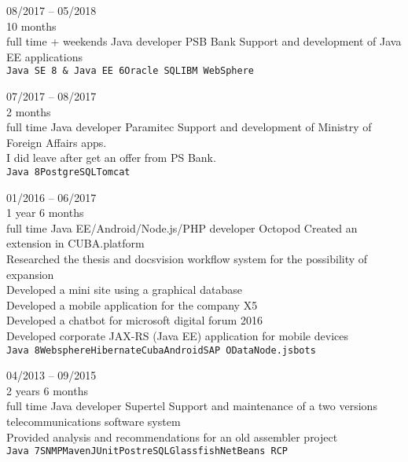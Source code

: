 \begin{entrylist}
    \entry
    {08/2017 -- 05/2018\\\footnotesize{10 months\\full time + weekends}}
    {Java developer}
    {PSB Bank}
    {
        Support and development of Java EE applications \\
        \texttt{Java SE 8 \& Java EE 6}\slashsep\texttt{Oracle SQL}\slashsep\texttt{IBM WebSphere}
    }
    
    \entry
    {07/2017 -- 08/2017\\\footnotesize{2 months\\full time}}
    {Java developer}
    {Paramitec}
    {
        Support and development of Ministry of Foreign Affairs apps. \\
        I did leave after get an offer from PS Bank. \\
        \texttt{Java 8}\slashsep\texttt{PostgreSQL}\slashsep\texttt{Tomcat}
    }
    
    \entry
    {01/2016 -- 06/2017\\\footnotesize{1 year 6 months\\full time}}
    {Java EE/Android/Node.js/PHP developer}
    {Octopod}
    {
        Created an extension in CUBA.platform \\
        Researched the thesis and docsvision workflow system for the possibility of expansion \\
        Developed a mini site using a graphical database \\
        Developed a mobile application for the company X5 \\
        Developed a chatbot for microsoft digital forum 2016 \\
        Developed corporate JAX-RS (Java EE) application for mobile devices\\
    \texttt{Java 8}\slashsep\texttt{Websphere}\slashsep\texttt{Hibernate}\slashsep\texttt{Cuba}\slashsep\texttt{Android}\slashsep\texttt{SAP OData}\slashsep\texttt{Node.js}\slashsep\texttt{bots}
	}
    
    \entry
    {04/2013 -- 09/2015\\\footnotesize{2 years 6 months\\full time}}
    {Java developer}
    {Supertel}
    {
        Support and maintenance of a two versions telecommunications software system \\
        Provided analysis and recommendations for an old assembler project \\
        \texttt{Java 7}\slashsep\texttt{SNMP}\slashsep\texttt{Maven}\slashsep\texttt{JUnit}\slashsep\texttt{PostreSQL}\slashsep\texttt{Glassfish}\slashsep\texttt{NetBeans RCP}
    }


\end{entrylist}
